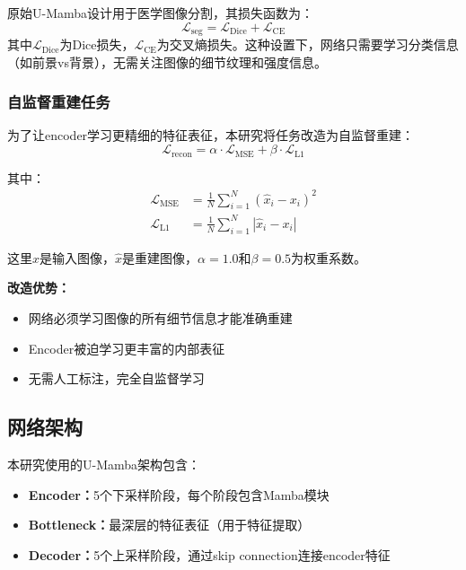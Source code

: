 \documentclass[11pt,a4paper]{article}
\begin{document}
原始U-Mamba设计用于医学图像分割，其损失函数为：
\begin{equation}
    \mathcal{L}_{\text{seg}} = \mathcal{L}_{\text{Dice}} + \mathcal{L}_{\text{CE}}
\end{equation}
其中$\mathcal{L}_{\text{Dice}}$为Dice损失，$\mathcal{L}_{\text{CE}}$为交叉熵损失。这种设置下，网络只需要学习分类信息（如前景vs背景），无需关注图像的细节纹理和强度信息。

\subsubsection{自监督重建任务}

为了让encoder学习更精细的特征表征，本研究将任务改造为自监督重建：
\begin{equation}
    \mathcal{L}_{\text{recon}} = \alpha \cdot \mathcal{L}_{\text{MSE}} + \beta \cdot \mathcal{L}_{\text{L1}}
\end{equation}

其中：
\begin{align}
    \mathcal{L}_{\text{MSE}} &= \frac{1}{N} \sum_{i=1}^{N} (\hat{x}_i - x_i)^2 \\
    \mathcal{L}_{\text{L1}} &= \frac{1}{N} \sum_{i=1}^{N} |\hat{x}_i - x_i|
\end{align}

这里$x$是输入图像，$\hat{x}$是重建图像，$\alpha=1.0$和$\beta=0.5$为权重系数。

\textbf{改造优势：}
\begin{itemize}
    \item 网络必须学习图像的所有细节信息才能准确重建
    \item Encoder被迫学习更丰富的内部表征
    \item 无需人工标注，完全自监督学习
\end{itemize}

\subsection{网络架构}

本研究使用的U-Mamba架构包含：

\begin{itemize}
    \item \textbf{Encoder：}5个下采样阶段，每个阶段包含Mamba模块
    \item \textbf{Bottleneck：}最深层的特征表征（用于特征提取）
    \item \textbf{Decoder：}5个上采样阶段，通过skip connection连接encoder特征
\end{itemize}
\end{document}
